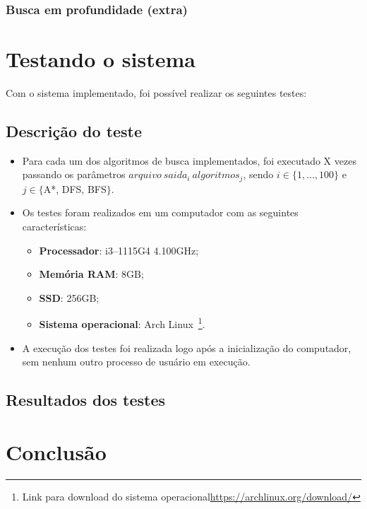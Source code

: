 \documentclass[12pt, a4paper]{article}
\begin{document}
\subsubsection{Busca em profundidade (extra)}\label{sec:bp}

\section{Testando o sistema}\label{sec:testes}
Com o sistema implementado, foi possível realizar os seguintes testes:
\subsection{Descrição do teste}
\begin{itemize}
    \item Para cada um dos algoritmos de busca implementados,
    foi executado X vezes passando os parâmetros \( arquivo ~ saida_i ~ algoritmos_j \),
    sendo \( i \in \{1, \ldots, 100\} \) e \( j \in \{ \)A*, DFS, BFS\( \} \).
    \item Os testes foram realizados em um computador com as seguintes características:
    \begin{itemize}
        \item\textbf{Processador}: i3--1115G4 4.100GHz;
        \item\textbf{Memória RAM}: 8GB\@;
        \item\textbf{SSD}: 256GB\@;
        \item\textbf{Sistema operacional}: Arch Linux~\footnote{Link para download do sistema operacional\url{https://archlinux.org/download/}}.
    \end{itemize}
    \item A execução dos testes foi realizada logo após a inicialização do computador, sem nenhum outro processo de usuário em execução.
\end{itemize}

\subsection{Resultados dos testes}\label{sec:res}


\section{Conclusão}\label{sec:concl}

%
\end{document}
